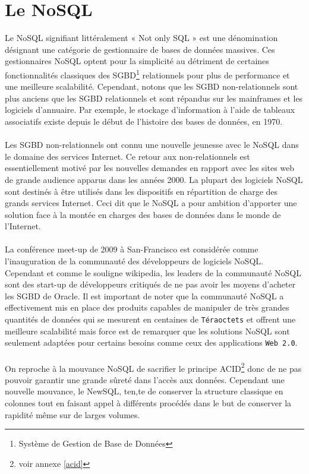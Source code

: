 \section{Le \textsf{NoSQL}}

Le NoSQL signifiant littéralement « \textsf{Not only SQL} » est une
dénomination désignant une catégorie de gestionnaire de bases de
données massives. Ces gestionnaires \textsf{NoSQL} optent pour la
simplicité au détriment de certaines fonctionnalités classiques des
\textsf{SGBD}\footnote{Système de Gestion de Base de Données}
relationnels pour plus de performance et une meilleure
scalabilité. Cependant, notons que les \textsf{SGBD} non-relationnels
sont plus anciens que les \textsf{SGBD} relationnels et sont répandus
sur les mainframes et les logiciels d'annuaire. Par exemple, le
stockage d'information à l'aide de tableaux associatifs existe depuis
le début de l'histoire des bases de données, en 1970.  \\ \\ Les
\textsf{SGBD} non-relationnels ont connu une nouvelle jeunesse avec le
\textsf{NoSQL} dans le domaine des services \textsf{Internet}. Ce
retour aux non-relationnels est essentiellement motivé par les
nouvelles demandes en rapport avec les sites web de grande audience
apparus dans les années 2000. La plupart des logiciels \textsf{NoSQL}
sont destinés à être utilisés dans les dispositifs en répartition de
charge des grands services \textsf{Internet}. Ceci dit que le
\textsf{NoSQL} a pour ambition d'apporter une solution face à la
montée en charges des bases de données dans le monde de
l'\textsf{Internet}.  \\ \\ La conférence meet-up de 2009 à
\textsf{San-Francisco} est considérée comme l'inauguration de la
communauté des développeurs de logiciels \textsf{NoSQL}. Cependant et
comme le souligne \textsf{wikipedia}, les leaders de la communauté
NoSQL sont des \textsf{start-up} de développeurs critiqués de ne pas
avoir les moyens d'acheter les SGBD de Oracle\cite{wikiNoSQL}. Il est
important de noter que la communauté \textsf{NoSQL} a effectivement
mis en place des produits capables de manipuler de très grandes
quantités de données qui se mesurent en centaines de
\texttt{Téraoctets} et offrent une meilleure scalabilité mais force
est de remarquer que les solutions \textsf{NoSQL} sont seulement
adaptées pour certains besoins comme ceux des applications \texttt{Web
  2.0}.  \\\\ On reproche à la mouvance \textsf{NoSQL} de sacrifier le
principe \textsf{ACID}\footnote{voir annexe \ref{acid}} donc de ne
pas pouvoir garantir une grande sûreté dans l'accès aux
données. Cependant une nouvelle mouvance, le \textsf{NewSQL}, ten,te
de conserver la structure classique en colonnes tout en faisant appel
à différents procédés dans le but de conserver la rapidité même sur de
larges volumes\cite{newSQL}.

